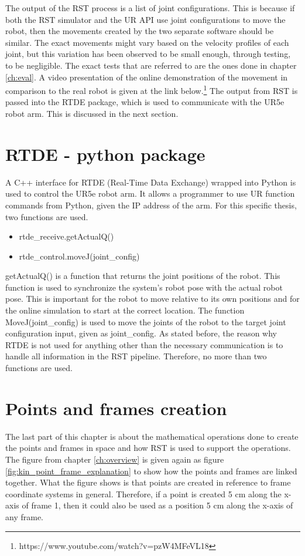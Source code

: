 The output of the RST process is a list of joint configurations. This is because if both the RST simulator and the UR API use joint configurations to move the robot, then the movements created by the two separate software should be similar. The exact movements might vary based on the velocity profiles of each joint, but this variation has been observed to be small enough, through testing, to be negligible. The exact tests that are referred to are the ones done in chapter \ref{ch:eval}.
A video presentation of the online demonstration of the movement in comparison to the real robot is given at the link below.\footnote{https://www.youtube.com/watch?v=pzW4MFeVL18} The output from RST is passed into the RTDE package, which is used to communicate with the UR5e robot arm. This is discussed in the next section.
\section{RTDE - python package}
A C++ interface for RTDE (Real-Time Data Exchange) wrapped into Python is used to control the UR5e robot arm. It allows a programmer to use UR function commands from Python, given the IP address of the arm. For this specific thesis, two functions are used.
\begin{itemize}
    \item rtde\_receive.getActualQ()
    \item rtde\_control.moveJ(joint\_config)
\end{itemize}
getActualQ() is a function that returns the joint positions of the robot. This function is used to synchronize the system's robot pose with the actual robot pose. This is important for the robot to move relative to its own positions and for the online simulation to start at the correct location.
The function MoveJ(joint\_config) is used to move the joints of the robot to the target joint configuration input, given as joint\_config. As stated before, the reason why RTDE is not used for anything other than the necessary communication is to handle all information in the RST pipeline. Therefore, no more than two functions are used.

\section{Points and frames creation}\label{sec:Kinematics_kin_impl}
The last part of this chapter is about the mathematical operations done to create the points and frames in space and how RST is used to support the operations. The figure from chapter \ref{ch:overview} is given again as figure \ref{fig:kin_point_frame_explanation} to show how the points and frames are linked together. What the figure shows is that points are created in reference to frame coordinate systems in general. Therefore, if a point is created 5 cm along the x-axis of frame 1, then it could also be used as a position 5 cm along the x-axis of any frame.

